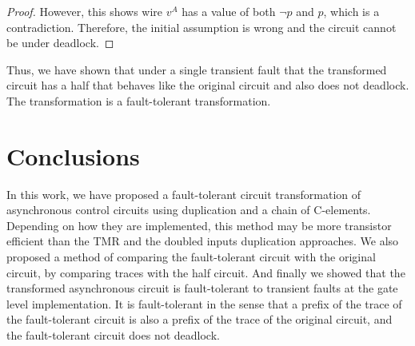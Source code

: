 \documentclass[12pt]{report}
\newtheorem*{theorem}{Theorem}
\begin{document}
\begin{proof}
However, this shows wire $v^A$ has a value of both $\neg{p}$ and $p$, which is a contradiction.  Therefore, the initial assumption is wrong and the circuit cannot be under deadlock.

\end{proof}



%
%

Thus, we have shown that under a single transient fault that the transformed circuit has a half that behaves like the original circuit and also does not deadlock.  The transformation is a fault-tolerant transformation.


\chapter{Conclusions}
In this work, we have proposed a fault-tolerant circuit transformation of asynchronous control circuits using duplication and a chain of C-elements.  Depending on how they are implemented, this method may be more transistor efficient than the TMR and the doubled inputs duplication approaches.  We also proposed a method of comparing the fault-tolerant circuit with the original circuit, by comparing traces with the half circuit.  And finally we showed that the transformed asynchronous circuit is fault-tolerant to transient faults at the gate level implementation.  It is fault-tolerant in the sense that a prefix of the trace of the fault-tolerant circuit is also a prefix of the trace of the original circuit, and the fault-tolerant circuit does not deadlock.\\
\end{document}
